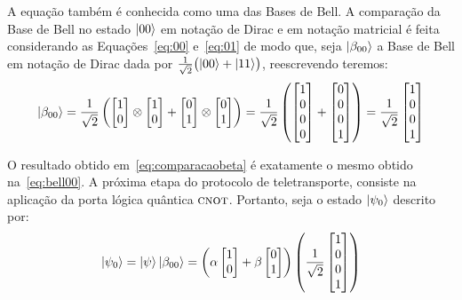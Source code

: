 A equação também é conhecida como uma das Bases de Bell. A comparação da Base de Bell no estado $\ket{00}$ em notação de Dirac e em notação matricial é feita considerando as Equações~\eqref{eq:00} e~\eqref{eq:01} de modo que, seja \(\ket{\beta_{00}}\) a Base de Bell em notação de Dirac dada por \(\frac{1}{\sqrt{2}} \bigl(\ket{00} + \ket{11}\bigr)\), reescrevendo teremos:
\begin{equation}\label{eq:comparacaobeta}
\ket{\beta_{00}} = \frac{1}{\sqrt{2}} \left( \begin{bmatrix}
1 \\
0
\end{bmatrix} \otimes \begin{bmatrix}
1 \\
0
\end{bmatrix} + \begin{bmatrix}
0 \\
1
\end{bmatrix} \otimes \begin{bmatrix}
0 \\
1
\end{bmatrix}\right) = \frac{1}{\sqrt{2}} \left( \begin{bmatrix}
1 \\
0 \\
0 \\
0 
\end{bmatrix} + \begin{bmatrix}
0 \\
0 \\
0 \\
1 
\end{bmatrix}\right) = \frac{1}{\sqrt{2}} \begin{bmatrix}
1 \\
0 \\
0 \\
1 
\end{bmatrix}
\end{equation}

O resultado obtido em~\eqref{eq:comparacaobeta} é exatamente o mesmo obtido na~\eqref{eq:bell00}.
A próxima etapa do protocolo de teletransporte, consiste na aplicação da porta lógica quântica \(\operatorname{\textsc{cnot}}\). Portanto, seja o estado $\ket{\psi_0}$ descrito por:
\begin{equation}\label{eq:psi0}
\ket{\psi_0}=\ket{\psi}\ket{\beta_{00}}=\left(\alpha \begin{bmatrix}
1 \\
0 
\end{bmatrix} + \beta \begin{bmatrix}
0 \\
1
\end{bmatrix}\right) \left(\frac{1}{\sqrt{2}} \begin{bmatrix}
1 \\
0 \\
0 \\
1
\end{bmatrix}\right)
\end{equation}

